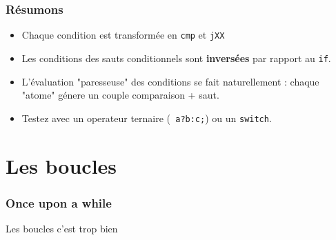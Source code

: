 \documentclass{beamer}
\begin{document}
\begin{frame}
\frametitle{Résumons}
\begin{itemize}
\item Chaque condition est transformée en \texttt{cmp} et \texttt{jXX}
\item Les conditions des sauts conditionnels sont \textbf{inversées} par rapport au \texttt{if}.
\item L'évaluation "paresseuse" des conditions se fait naturellement : chaque "atome" génere un couple comparaison + saut.
\item Testez avec un operateur ternaire (\texttt{ a?b:c;}) ou un \lstinline+switch+.
\end{itemize}
\end{frame}



\section{Les boucles}
\begin{frame}
\frametitle{Once upon a while}
Les boucles c'est trop bien
\end{frame}



%





\end{document}
